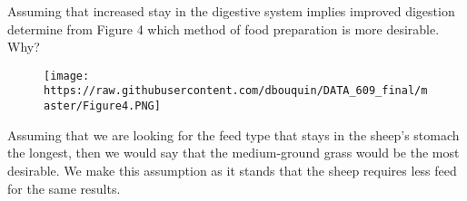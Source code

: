 \documentclass[]{article}
\begin{document}
Assuming that increased stay in the digestive system implies improved
digestion determine from Figure 4 which method of food preparation is
more desirable. Why?

\begin{figure}[htbp]
\centering
\texttt{[image: https://raw.githubusercontent.com/dbouquin/DATA\_609\_final/master/Figure4.PNG]}
\caption{}
\end{figure}

Assuming that we are looking for the feed type that stays in the sheep's
stomach the longest, then we would say that the medium-ground grass
would be the most desirable. We make this assumption as it stands that
the sheep requires less feed for the same results.
\end{document}
